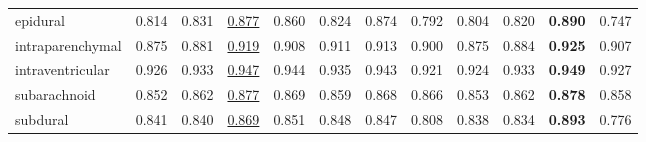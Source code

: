 \begin{minipage}{\textwidth}
{\begin{tabular}{@{}lccccccccccc@{}}
epidural & 0.814 & 0.831 & \underline{0.877} & 0.860 & 0.824 & 0.874 & 0.792 & 0.804 & 0.820 & \textbf{0.890} & 0.747 \\
intraparenchymal & 0.875 & 0.881 & \underline{0.919} & 0.908 & 0.911 & 0.913 & 0.900 & 0.875 & 0.884 & \textbf{0.925} & 0.907 \\
intraventricular & 0.926 & 0.933 & \underline{0.947} & 0.944 & 0.935 & 0.943 & 0.921 & 0.924 & 0.933 & \textbf{0.949} & 0.927 \\
subarachnoid & 0.852 & 0.862 & \underline{0.877} & 0.869 & 0.859 & 0.868 & 0.866 & 0.853 & 0.862 & \textbf{0.878} & 0.858 \\
subdural & 0.841 & 0.840 & \underline{0.869} & 0.851 & 0.848 & 0.847 & 0.808 & 0.838 & 0.834 & \textbf{0.893} & 0.776 \\
\bottomrule
\end{tabular}
}\end{minipage}
\par\bigskip
